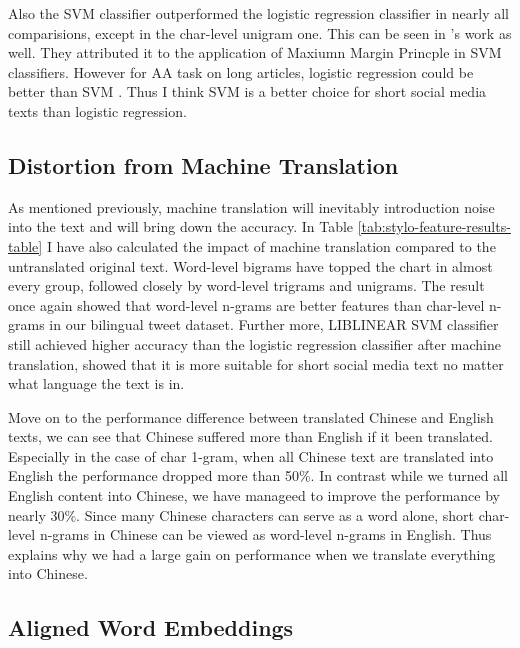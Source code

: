 \documentclass[11pt,a4paper]{article}
\begin{document}
Also the SVM classifier outperformed the logistic regression classifier in nearly all comparisions, except in the char-level unigram one. This can be seen in \citet{rocha2016authorship}'s work as well. They attributed it to the application of Maxiumn Margin Princple in SVM classifiers. However for AA task on long articles, logistic regression could be better than SVM \cite{bogdanova2014cross}. Thus I think SVM is a better choice for short social media texts than logistic regression.

\subsection{Distortion from Machine Translation}

As mentioned previously, machine translation will inevitably introduction noise into the text and will bring down the accuracy. In Table \ref{tab:stylo-feature-results-table} I have also calculated the impact of machine translation compared to the untranslated original text. Word-level bigrams have topped the chart in almost every group, followed closely by word-level trigrams and unigrams. The result once again showed that word-level n-grams are better features than char-level n-grams in our bilingual tweet dataset. Further more, LIBLINEAR SVM classifier still achieved higher accuracy than the logistic regression classifier after machine translation, showed that it is more suitable for short social media text no matter what language the text is in.

Move on to the performance difference between translated Chinese and English texts, we can see that Chinese suffered more than English if it been translated. Especially in the case of char 1-gram, when all Chinese text are translated into English the performance dropped more than 50\%. In contrast while we turned all English content into Chinese, we have manageed to improve the performance by nearly 30\%. Since many Chinese characters can serve as a word alone, short char-level n-grams in Chinese can be viewed as word-level n-grams in English. Thus explains why we had a large gain on performance when we translate everything into Chinese.

\subsection{Aligned Word Embeddings}
\end{document}
